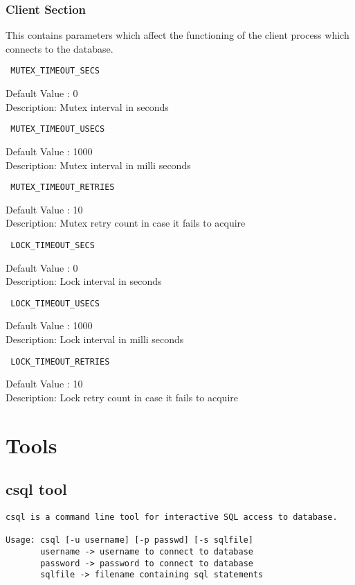 \documentclass[12pt]{article}
\begin{document}
\subsubsection{Client Section}
\label{serversection}
This contains parameters which affect the functioning of the client process which connects to the database.

\begin{verbatim} MUTEX_TIMEOUT_SECS \end{verbatim}
Default Value : 0 \\
Description: Mutex interval in seconds

\begin{verbatim} MUTEX_TIMEOUT_USECS \end{verbatim}
Default Value : 1000 \\
Description: Mutex interval in milli seconds

\begin{verbatim} MUTEX_TIMEOUT_RETRIES \end{verbatim}
Default Value : 10 \\
Description: Mutex retry count in case it fails to acquire


\begin{verbatim} LOCK_TIMEOUT_SECS \end{verbatim}
Default Value : 0 \\
Description: Lock interval in seconds

\begin{verbatim} LOCK_TIMEOUT_USECS \end{verbatim}
Default Value : 1000 \\
Description: Lock interval in milli seconds

\begin{verbatim} LOCK_TIMEOUT_RETRIES \end{verbatim}
Default Value : 10 \\
Description: Lock retry count in case it fails to acquire

\section{Tools}
\label{tools}
\subsection{csql tool}
\label{csqltool}
\begin{verbatim}
csql is a command line tool for interactive SQL access to database.

Usage: csql [-u username] [-p passwd] [-s sqlfile] 
       username -> username to connect to database
       password -> password to connect to database
       sqlfile -> filename containing sql statements
\end{verbatim}
\end{document}

